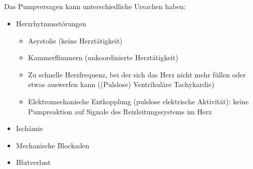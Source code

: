 

\subsection{}
\label{bkm:RefHeading42514602}
\label{topic:kreislaufstillstand}


\Text
{\TxBeschreibung}
{%
Das Pumpversagen kann unterschiedliche Ursachen haben:
\begin{itemize}
  \item Herzrhytmusstörungen
  \begin{itemize}
    \item Asystolie (keine Herztätigkeit)
    \item Kammerflimmern (unkoordinierte Herztätigkeit)
    \item Zu schnelle Herzfrequenz, bei der sich das Herz
    nicht mehr füllen oder etwas auswerfen kann ((Pulslose)
    Ventrikuläre Tachykardie)
    \item Elektromechanische
    Entkopplung (pulslose elektrische Aktivität): keine
    Pumpreaktion auf Signale des Reizleitungssystems im Herz
  \end{itemize}
  \item Ischämie
  \item Mechanische Blockaden
  \item Blutverlust
\end{itemize}
}
{}
{}
{}
{}


\clearpage%

